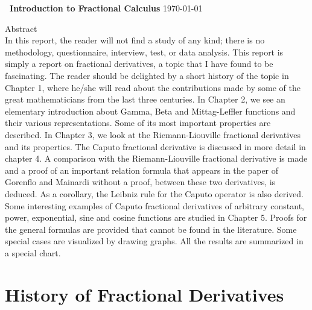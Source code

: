 \documentclass[a4paper,14pt,oneside]{book}
\theoremstyle{plain}
\theoremstyle{definition}
\theoremstyle{remark}
\begin{document}
\begin{titlepage}
\begin{center}
\newpage
\vspace{5cm}
\centering
\Huge
\textbf{\newline\ Introduction to Fractional Calculus}
\vfill
\today
\end{center}
\end{titlepage}

\begin{center}
\vspace*{4cm}
\huge{Abstract}\\
\justify
\Large{
In this report, the reader will not find a study of any kind; there is no
methodology, questionnaire, interview, test, or data analysis. This report is simply a report on fractional derivatives, a topic that I have found to be fascinating. The reader should be delighted by a short history of the topic in Chapter 1, where he/she will read about the contributions made by some of the great mathematicians from the last three centuries. In Chapter 2, we see an elementary introduction about Gamma, Beta and Mittag-Leffler functions and their various representations. Some of its most important properties are described. In Chapter 3, we look at the Riemann-Liouville fractional derivatives and its properties. The Caputo fractional derivative is discussed in more detail in chapter 4. A comparison with the Riemann-Liouville fractional derivative is made and a proof of an important relation formula that appears in the paper of Gorenflo and Mainardi \cite{bb18} without a proof, between these two derivatives, is deduced. As a corollary, the Leibniz rule for the Caputo operator is also derived. Some interesting examples of Caputo fractional derivatives of arbitrary constant,
power, exponential, sine and cosine functions are studied in Chapter 5. Proofs for the
general formulas are provided that cannot be found in the literature. Some special cases
are visualized by drawing graphs. All the results are summarized in a special chart. }
\end{center}

\Large{\tableofcontents}
\newpage
         
         \vspace{1cm} \chapter{History of Fractional Derivatives}
\end{document}
